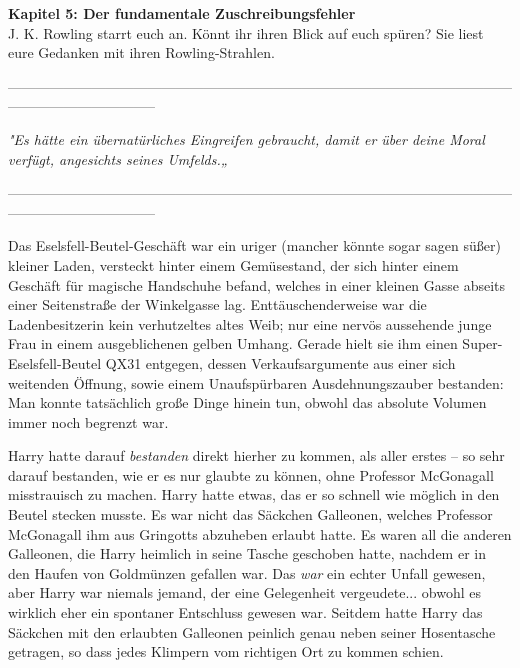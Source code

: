

\hypertarget{der-fundamentale-zuschreibungsfehler}{%

\textbf{Kapitel 5: Der fundamentale Zuschreibungsfehler}\\

\hfill\break J. K. Rowling starrt euch an. Könnt ihr ihren Blick auf euch spüren? Sie liest eure Gedanken mit ihren Rowling-Strahlen.

--------------------------------------------------------------------------------------------------------------------------------------------

\hfill\break

\emph{\emph{"Es hätte ein übernatürliches Eingreifen gebraucht, damit er über deine Moral verfügt, angesichts seines Umfelds.„}}

\hfill\break

--------------------------------------------------------------------------------------------------------------------------------------------

\hfill\break Das Eselsfell-Beutel-Geschäft war ein uriger (mancher könnte sogar sagen süßer) kleiner Laden, versteckt hinter einem Gemüsestand, der sich hinter einem Geschäft für magische Handschuhe befand, welches in einer kleinen Gasse abseits einer Seitenstraße der Winkelgasse lag. Enttäuschenderweise war die Ladenbesitzerin kein verhutzeltes altes Weib; nur eine nervös aussehende junge Frau in einem ausgeblichenen gelben Umhang. Gerade hielt sie ihm einen Super-Eselsfell-Beutel QX31 entgegen, dessen Verkaufsargumente aus einer sich weitenden Öffnung, sowie einem Unaufspürbaren Ausdehnungszauber bestanden: Man konnte tatsächlich große Dinge hinein tun, obwohl das absolute Volumen immer noch begrenzt war.

Harry hatte darauf \emph{bestanden} direkt hierher zu kommen, als aller erstes -- so sehr darauf bestanden, wie er es nur glaubte zu können, ohne Professor McGonagall misstrauisch zu machen. Harry hatte etwas, das er so schnell wie möglich in den Beutel stecken musste. Es war nicht das Säckchen Galleonen, welches Professor McGonagall ihm aus Gringotts abzuheben erlaubt hatte. Es waren all die anderen Galleonen, die Harry heimlich in seine Tasche geschoben hatte, nachdem er in den Haufen von Goldmünzen gefallen war. Das \emph{war} ein echter Unfall gewesen, aber Harry war niemals jemand, der eine Gelegenheit vergeudete... obwohl es wirklich eher ein spontaner Entschluss gewesen war. Seitdem hatte Harry das Säckchen mit den erlaubten Galleonen peinlich genau neben seiner Hosentasche getragen, so dass jedes Klimpern vom richtigen Ort zu kommen schien.

}
